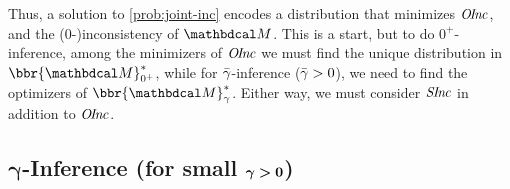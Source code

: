 Thus, a solution to \eqref{prob:joint-inc}
encodes a distribution that minimizes $\mathit{O\mskip-2.5muI\mskip-3.5mun\mskip-1.7muc}$, and
the (0-)inconsistency
of $\dg M$.
This is a start, but to do 
$0^+$-inference,
among the minimizers of $\mathit{O\mskip-2.5muI\mskip-3.5mun\mskip-1.7muc}$
we must find the unique distribution in $\bbr{\dg M}^*_{0^+}$, 
while for ${\bar\gamma}$-inference (${\bar\gamma} > 0$), we need to find the optimizers of
$\bbr{\dg M}^*_\gamma$.
Either way, we must consider 
$\mathit{S\mskip-2.5muI\mskip-3.5mun\mskip-1.7muc}$
in addition to $\mathit{O\mskip-2.5muI\mskip-3.5mun\mskip-1.7muc}$. 

\subsection{%
    \texorpdfstring{$\boldsymbol\gamma$}{gamma}-Inference
    (for small \texorpdfstring{$\boldsymbol\gamma\boldsymbol>\mathbf{0}$}{gamma})%
} \label{sec:small-gamma}

